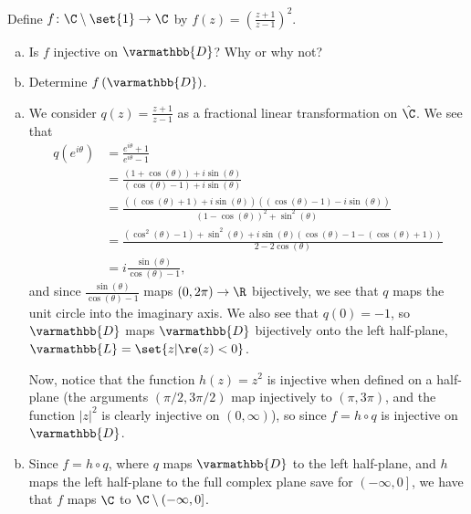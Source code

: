 \documentclass[10pt]{mypackage}
\renewcommand*{\mathbb}[1]{\varmathbb{#1}}
\begin{document}
\begin{problem}[Problem 2]
  Define $f\colon \C\setminus \set{1}\rightarrow \C$ by $f(z) = \left( \frac{z+1}{z-1} \right)^2$.
  \begin{enumerate}[(a)]
    \item Is $f$ injective on $ \mathbb{D} $? Why or why not?
    \item Determine $f\left( \mathbb{D} \right)$.
  \end{enumerate}
\end{problem}
\begin{solution}\hfill
  \begin{enumerate}[(a)]
    \item We consider $q(z) = \frac{z+1}{z-1}$ as a fractional linear transformation on $\hat{\C}$. We see that
      \begin{align*}
        q\left( e^{i\theta} \right) &= \frac{e^{i\theta} + 1}{e^{i\theta} - 1}\\
                                    &= \frac{\left( 1+\cos\left( \theta \right) \right) + i\sin\left( \theta \right)}{\left( \cos\left( \theta \right) - 1 \right) + i\sin\left( \theta \right)}\\
                                    &= \frac{\left( \left( \cos\left( \theta \right) +1 \right) + i\sin\left( \theta \right) \right)\left( \left( \cos\left( \theta \right)-1 \right) - i\sin\left( \theta \right)  \right)}{\left( 1-\cos\left( \theta \right) \right)^2 + \sin^2\left( \theta \right)}\\
                                    &= \frac{\left( \cos^2\left( \theta \right) - 1 \right) + \sin^2\left( \theta \right) + i\sin\left( \theta \right)\left( \cos\left( \theta \right) - 1 - \left( \cos\left( \theta \right) + 1 \right) \right)}{2-2\cos\left( \theta \right)}\\
                                    &= i\frac{\sin\left( \theta \right)}{\cos\left( \theta \right)-1},
      \end{align*}
      and since $\frac{\sin\left( \theta \right)}{\cos\left( \theta \right)-1}$ maps $(0,2\pi)\rightarrow \R$ bijectively, we see that $q$ maps the unit circle into the imaginary axis. We also see that $q(0) = -1$, so $\mathbb{D}$ maps $\mathbb{D}$ bijectively onto the left half-plane, $ \mathbb{L} = \set{z | \re(z) < 0} $.\newline

      Now, notice that the function $h(z) = z^2$ is injective when defined on a half-plane (the arguments $\left( \pi/2,3\pi/2 \right)$ map injectively to $\left( \pi,3\pi \right)$, and the function $\left\vert z \right\vert^2$ is clearly injective on $(0,\infty)$), so since $f = h\circ q$ is injective on $ \mathbb{D} $.
    \item Since $f = h\circ q$, where $q$ maps $ \mathbb{D} $ to the left half-plane, and $h$ maps the left half-plane to the full complex plane save for $\left( -\infty,0 \right]$, we have that $f$ maps $\C$ to $\C\setminus (-\infty,0]$.
  \end{enumerate}
\end{solution}
\end{document}
